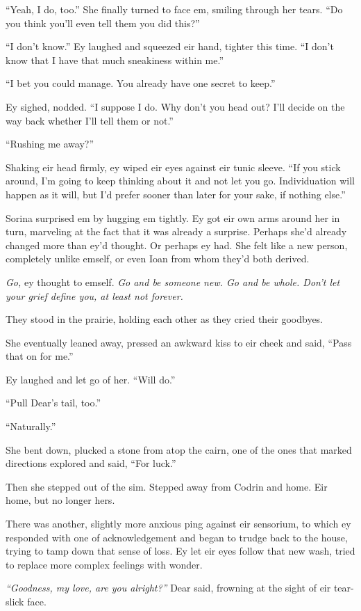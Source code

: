 ``Yeah, I do, too.'' She finally turned to face em, smiling through her tears. ``Do you think you'll even tell them you did this?''

``I don't know.'' Ey laughed and squeezed eir hand, tighter this time. ``I don't know that I have that much sneakiness within me.''

``I bet you could manage. You already have one secret to keep.''

Ey sighed, nodded. ``I suppose I do. Why don't you head out? I'll decide on the way back whether I'll tell them or not.''

``Rushing me away?''

Shaking eir head firmly, ey wiped eir eyes against eir tunic sleeve. ``If you stick around, I'm going to keep thinking about it and not let you go. Individuation will happen as it will, but I'd prefer sooner than later for your sake, if nothing else.''

Sorina surprised em by hugging em tightly. Ey got eir own arms around her in turn, marveling at the fact that it was already a surprise. Perhaps she'd already changed more than ey'd thought. Or perhaps ey had. She felt like a new person, completely unlike emself, or even Ioan from whom they'd both derived.

\emph{Go,} ey thought to emself. \emph{Go and be someone new. Go and be whole. Don't let your grief define you, at least not forever.}

They stood in the prairie, holding each other as they cried their goodbyes.

She eventually leaned away, pressed an awkward kiss to eir cheek and said, ``Pass that on for me.''

Ey laughed and let go of her. ``Will do.''

``Pull Dear's tail, too.''

``Naturally.''

She bent down, plucked a stone from atop the cairn, one of the ones that marked directions explored and said, ``For luck.''

Then she stepped out of the sim. Stepped away from Codrin and home. Eir home, but no longer hers.

There was another, slightly more anxious ping against eir sensorium, to which ey responded with one of acknowledgement and began to trudge back to the house, trying to tamp down that sense of loss. Ey let eir eyes follow that new wash, tried to replace more complex feelings with wonder.

\emph{``Goodness, my love, are you alright?''} Dear said, frowning at the sight of eir tear-slick face.

